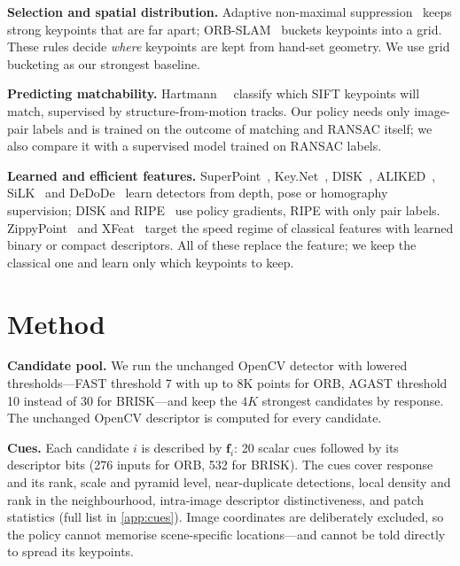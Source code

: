 \documentclass[10pt,twocolumn,letterpaper]{article}
\newcommand{\q}[1]{\noindent\textbf{#1}\hspace{0.4em}}
\begin{document}
\q{Selection and spatial distribution.} Adaptive non-maximal suppression~\cite{brown2005anms,bailo2018ssc}
keeps strong keypoints that are far apart; ORB-SLAM~\cite{murartal2015orbslam} buckets keypoints into a grid.
These rules decide \emph{where} keypoints are kept from hand-set geometry. We use grid bucketing as our
strongest baseline.

\q{Predicting matchability.} Hartmann~\etal~\cite{hartmann2014matchability} classify which SIFT keypoints will
match, supervised by structure-from-motion tracks. Our policy needs only image-pair labels and is trained on the
outcome of matching and RANSAC itself; we also compare it with a supervised model trained on RANSAC labels.

\q{Learned and efficient features.} SuperPoint~\cite{detone2018superpoint}, Key.Net~\cite{barroso2019keynet},
DISK~\cite{tyszkiewicz2020disk}, ALIKED~\cite{zhao2023aliked}, SiLK~\cite{gleize2023silk} and
DeDoDe~\cite{edstedt2024dedode} learn detectors from depth, pose or homography supervision; DISK and
RIPE~\cite{kunzel2025ripe} use policy gradients, RIPE with only pair labels. ZippyPoint~\cite{kanakis2023zippypoint}
and XFeat~\cite{potje2024xfeat} target the speed regime of classical features with learned binary or compact
descriptors. All of these replace the feature; we keep the classical one and learn only which keypoints to keep.

\section{Method}
\label{sec:method}

\q{Candidate pool.} We run the unchanged OpenCV detector with lowered thresholds---FAST threshold 7 with up to
8K points for ORB, AGAST threshold 10 instead of 30 for BRISK---and keep the $4K$ strongest candidates by
response. The unchanged OpenCV descriptor is computed for every candidate.

\q{Cues.} Each candidate $i$ is described by $\mathbf{f}_i$: 20 scalar cues followed by its descriptor bits (276
inputs for ORB, 532 for BRISK). The cues cover response and its rank, scale and pyramid level, near-duplicate
detections, local density and rank in the neighbourhood, intra-image descriptor distinctiveness, and patch
statistics (full list in \cref{app:cues}). Image coordinates are deliberately excluded, so the policy cannot
memorise scene-specific locations---and cannot be told directly to spread its keypoints.
\end{document}
